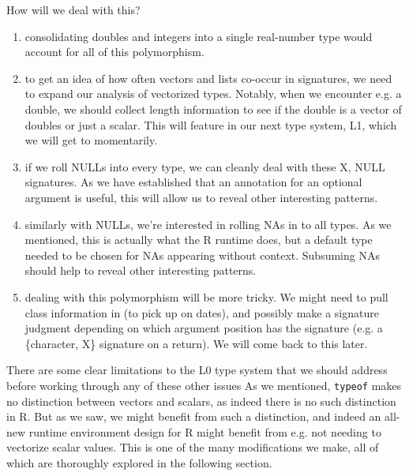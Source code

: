 \documentclass[acmsmall,10pt,review,anonymous]{acmart}\settopmatter{printfolios=true,printccs=false,printacmref=false}
\newcommand{\code}[1]{\lstinline|#1|\xspace}
\begin{document}
How will we deal with this?

\begin{enumerate}

	\item consolidating doubles and integers into a single real-number type would account for all of this polymorphism.
	
	\item to get an idea of how often vectors and lists co-occur in signatures, we need to expand our analysis of vectorized types.
	Notably, when we encounter e.g. a double, we should collect length information to see if the double is a vector of doubles or just a scalar.
	This will feature in our next type system, L1, which we will get to momentarily.
	
	\item if we roll NULLs into every type, we can cleanly deal with these X, NULL signatures.
	As we have established that an annotation for an optional argument is useful, this will allow us to reveal other interesting patterns.
	
	\item similarly with NULLs, we're interested in rolling NAs in to all types.
	As we mentioned, this is actually what the R runtime does, but a default type needed to be chosen for NAs appearing without context.
	Subsuming NAs should help to reveal other interesting patterns.
		
	\item dealing with this polymorphism will be more tricky.
	We might need to pull class information in (to pick up on dates), and possibly make a signature judgment depending on which argument position has the signature (e.g. a \{character, X\} signature on a return).
	We will come back to this later.

\end{enumerate}

There are some clear limitations to the L0 type system that we should address before working through any of these other issues
As we mentioned, \code{typeof} makes no distinction between vectors and scalars, as indeed there is no such distinction in R. 
But as we saw, we might benefit from such a distinction, and indeed an all-new runtime environment design for R might benefit from e.g. not needing to vectorize scalar values.
This is one of the many modifications we make, all of which are thoroughly explored in the following section.
\end{document}
